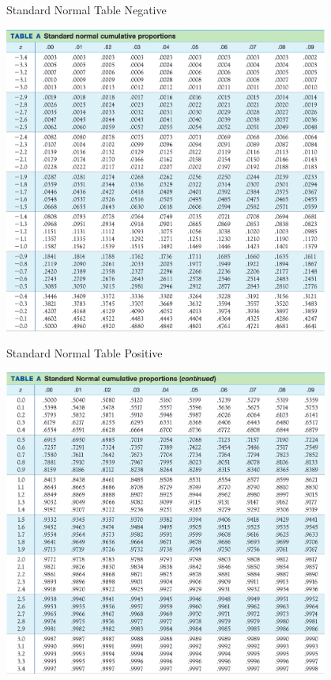\documentclass{beamer}
\begin{document}
\begin{frame}{Standard Normal Table Negative}
    \begin{center}
        \includegraphics[width=0.8\textwidth]{z-table_neg.png}
    \end{center}
\end{frame}

\begin{frame}{Standard Normal Table Positive}
    \begin{center}
        \includegraphics[width=0.8\textwidth]{z-table_pos.png}
    \end{center}
\end{frame}
\end{document}
